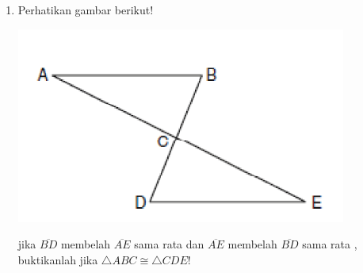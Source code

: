\documentclass[12pt,a4paper]{exam}
\begin{document}
\begin{enumerate}
				\item Perhatikan gambar berikut!
				
				\includegraphics[scale=0.5]{screenshot005}
				
				jika $\overline{BD}$ membelah $\overline{AE}$ sama rata dan $\overline{AE}$ membelah $\overline{BD}$ sama rata , buktikanlah jika $\triangle ABC \cong \triangle CDE$!




		\end{enumerate}	
	
\end{document}
